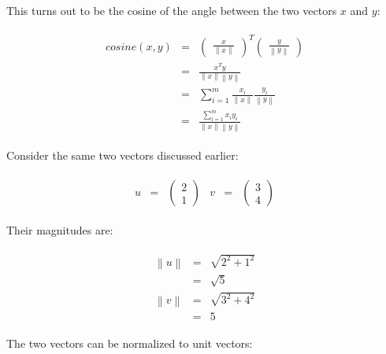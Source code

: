 \documentclass[
  letterpaper,
]{scrbook}
\begin{document}
This turns out to be the cosine of the angle between the two vectors
\(x\) and \(y\):

\[\begin{aligned}
  \begin{matrix}
    cosine(x,y)
      & = &
      \begin{pmatrix}\frac{x}{\left\lVert x \right\rVert}\end{pmatrix}^T
      \begin{pmatrix}\frac{y}{\left\lVert y \right\rVert} \end{pmatrix} \\
      & = & \frac{x^T y}{\left\lVert x \right\rVert \left\lVert y \right\rVert} \\
      & = & \sum_{i=1}^{m} \frac{x_i}{\left\lVert x \right\rVert} \frac{y_i}{\left\lVert y \right\rVert} \\
      & = & \frac{\sum_{i=1}^{m} x_i y_i}{\left\lVert x \right\rVert \left\lVert y \right\rVert}
    \end{matrix}
\end{aligned}\]

Consider the same two vectors discussed earlier:

\[\begin{aligned}
  \begin{matrix}
    u & = &
      \begin{pmatrix}
        2 \\ 1
      \end{pmatrix}
    &
    v & = &
      \begin{pmatrix}
        3 \\ 4
      \end{pmatrix}
  \end{matrix}
\end{aligned}\]

Their magnitudes are:

\[\begin{aligned}
  \begin{matrix}
    \left\lVert u \right\rVert & = & \sqrt{2^2 + 1^2} \\
          & = & \sqrt{5} \\
    \left\lVert v \right\rVert & = & \sqrt{3^2 + 4^2} \\
          & = & 5
    \end{matrix}
\end{aligned}\]

The two vectors can be normalized to unit vectors:
\end{document}
